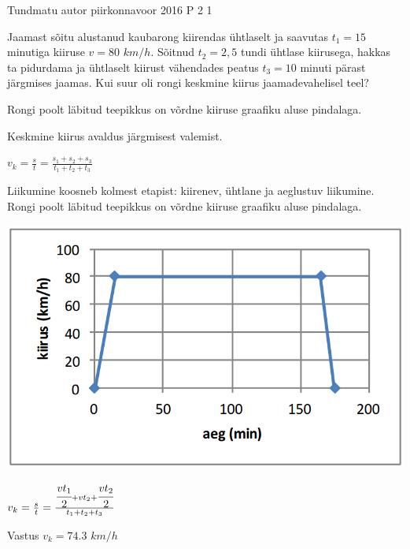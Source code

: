 {Tundmatu autor} %
{piirkonnavoor} %
{2016} %
{P 2} %
{1} %
{
\ifStatement
Jaamast sõitu alustanud kaubarong kiirendas ühtlaselt ja saavutas $t_1=15$ minutiga kiiruse $v=80$ $km/h$. Sõitnud $t_2 = 2,5$ tundi ühtlase kiirusega, hakkas ta pidurdama ja ühtlaselt kiirust vähendades peatus $t_3=10$ minuti pärast järgmises jaamas. Kui suur oli rongi keskmine kiirus jaamadevahelisel teel?
\fi


\ifHint
Rongi poolt läbitud teepikkus on võrdne kiiruse graafiku aluse pindalaga.
\fi

\ifSolution
Keskmine kiirus avaldus järgmisest valemist.
\begin{center}
$v_k = \frac{s}{t} = \frac {s_1 + s_2 + s_3}{t_1 + t_2 + t_3}$
\end{center}
Liikumine koosneb kolmest etapist: kiirenev, ühtlane ja aeglustuv liikumine. Rongi poolt läbitud teepikkus on võrdne kiiruse graafiku aluse pindalaga.
\begin{center}
	\includegraphics[width=0.5\linewidth]{2016-v2p-02-lah.png}
\end{center}
\begin{center}
$v_k = \frac{s}{t} = \frac{\cfrac{vt_1}{2} + vt_2 + \cfrac{vt_2}{2}}{t_1 + t_2 + t_3}$
\end{center}
Vastus $v_k = 74.3$ $km/h$
\fi
}